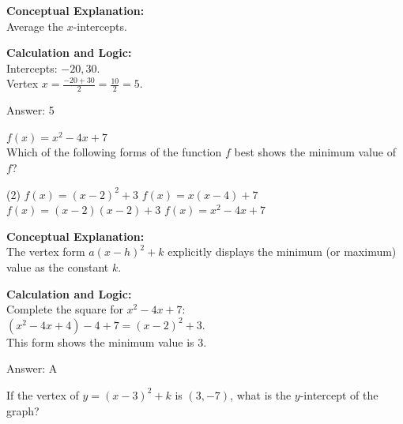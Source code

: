 \documentclass[11pt,paper=a4,answers]{exam}
\begin{document}
\begin{questions}
\begin{solution}
\textbf{Conceptual Explanation:} \\
Average the $x$-intercepts.

\vspace{20pt}

\textbf{Calculation and Logic:} \\
Intercepts: $-20, 30$. \\
Vertex $x = \frac{-20+30}{2} = \frac{10}{2} = 5$.

\vspace{25pt}

Answer: \colorbox{yellow!100}{5}
\end{solution}

\vspace{40pt}

\question
$f(x) = x^2 - 4x + 7$ \\
Which of the following forms of the function $f$ best shows the minimum value of $f$?
\begin{tasks}(2)
    \task $f(x) = (x-2)^2 + 3$
    \task $f(x) = x(x-4) + 7$
    \task $f(x) = (x-2)(x-2) + 3$
    \task $f(x) = x^2 - 4x + 7$
\end{tasks}

\begin{solution}
\textbf{Conceptual Explanation:} \\
The vertex form $a(x-h)^2 + k$ explicitly displays the minimum (or maximum) value as the constant $k$.

\vspace{20pt}

\textbf{Calculation and Logic:} \\
Complete the square for $x^2 - 4x + 7$: \\
$(x^2 - 4x + 4) - 4 + 7 = (x-2)^2 + 3$. \\
This form shows the minimum value is 3.

\vspace{25pt}

Answer: \colorbox{yellow!100}{A}
\end{solution}

\vspace{40pt}

\question
If the vertex of $y = (x-3)^2 + k$ is $(3, -7)$, what is the $y$-intercept of the graph?


\end{questions}
\end{document}
